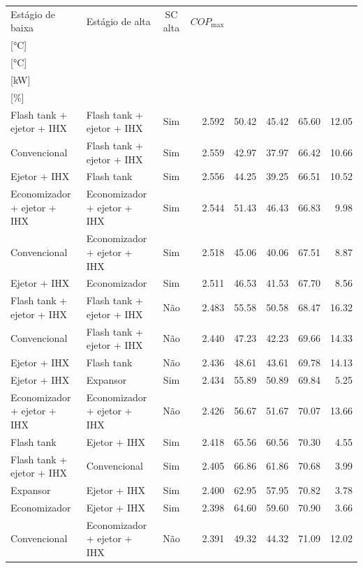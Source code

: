 {\small\setlength{\tabcolsep}{4pt}\renewcommand{\arraystretch}{1.12}
\begin{tabular}{llcrrrrr}
\toprule
Estágio de baixa & Estágio de alta & SC alta & $COP_{\max}$ & \shortstack{$T_{\mathrm{cond,l}}^*$\\{[°C]}} & \shortstack{$T_{\mathrm{evap,h}}^*$\\{[°C]}} & \shortstack{$\dot W_{\mathrm{liq}}$\\{[kW]}} & \shortstack{$\Delta COP_{\mathrm{opt}}$\\{[\%]}} \\
\midrule
Flash tank + ejetor + IHX & Flash tank + ejetor + IHX & Sim & 2.592 & 50.42 & 45.42 & 65.60 & 12.05 \\
Convencional & Flash tank + ejetor + IHX & Sim & 2.559 & 42.97 & 37.97 & 66.42 & 10.66 \\
Ejetor + IHX & Flash tank & Sim & 2.556 & 44.25 & 39.25 & 66.51 & 10.52 \\
Economizador + ejetor + IHX & Economizador + ejetor + IHX & Sim & 2.544 & 51.43 & 46.43 & 66.83 & 9.98 \\
Convencional & Economizador + ejetor + IHX & Sim & 2.518 & 45.06 & 40.06 & 67.51 & 8.87 \\
Ejetor + IHX & Economizador & Sim & 2.511 & 46.53 & 41.53 & 67.70 & 8.56 \\
Flash tank + ejetor + IHX & Flash tank + ejetor + IHX & Não & 2.483 & 55.58 & 50.58 & 68.47 & 16.32 \\
Convencional & Flash tank + ejetor + IHX & Não & 2.440 & 47.23 & 42.23 & 69.66 & 14.33 \\
Ejetor + IHX & Flash tank & Não & 2.436 & 48.61 & 43.61 & 69.78 & 14.13 \\
Ejetor + IHX & Expansor & Sim & 2.434 & 55.89 & 50.89 & 69.84 & 5.25 \\
Economizador + ejetor + IHX & Economizador + ejetor + IHX & Não & 2.426 & 56.67 & 51.67 & 70.07 & 13.66 \\
Flash tank & Ejetor + IHX & Sim & 2.418 & 65.56 & 60.56 & 70.30 & 4.55 \\
Flash tank + ejetor + IHX & Convencional & Sim & 2.405 & 66.86 & 61.86 & 70.68 & 3.99 \\
Expansor & Ejetor + IHX & Sim & 2.400 & 62.95 & 57.95 & 70.82 & 3.78 \\
Economizador & Ejetor + IHX & Sim & 2.398 & 64.60 & 59.60 & 70.90 & 3.66 \\
Convencional & Economizador + ejetor + IHX & Não & 2.391 & 49.32 & 44.32 & 71.09 & 12.02 \\

\end{tabular}}

